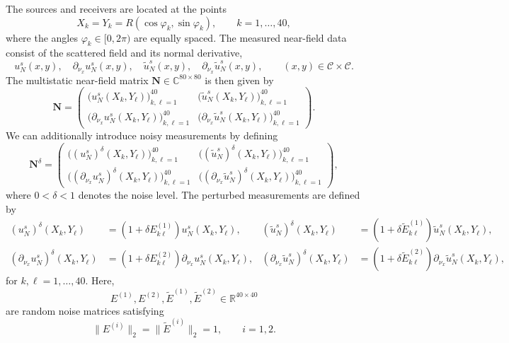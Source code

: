 \documentclass{article}
\begin{document}
The sources and receivers are located at the points 
\[
X_k=Y_k=R(\cos{\varphi_k},\sin{\varphi_k}),
\qquad k=1,\dots,40,
\]
where the angles $\varphi_k\in[0,2\pi)$ are equally spaced. The measured near-field data consist of the scattered field and its normal derivative,
\[
u_N^s(x,y),\quad \partial_{\nu_x}u_N^s(x,y),\quad
\widetilde{u}_N^s(x,y),\quad
\partial_{\nu_x}\widetilde{u}_N^s(x,y),
\qquad (x,y)\in\mathcal{C}\times\mathcal{C}.
\]
The multistatic near-field matrix $\mathbf{N}\in\mathbb{C}^{80\times80}$ is then given by
\begin{equation}\label{NFmatrix}
\mathbf{N}
=
\begin{pmatrix}
\big(u_N^s(X_k,Y_\ell)\big)_{k,\ell=1}^{40}
&
\big(\widetilde{u}_N^s(X_k,Y_\ell)\big)_{k,\ell=1}^{40}
\\[2mm]
\big(\partial_{\nu_x}u_N^s(X_k,Y_\ell)\big)_{k,\ell=1}^{40}
&
\big(\partial_{\nu_x}\widetilde{u}_N^s(X_k,Y_\ell)\big)_{k,\ell=1}^{40}
\end{pmatrix}.
\end{equation}
We can additionally introduce noisy measurements by defining
\begin{equation}
\mathbf{N}^{\delta}
=
\begin{pmatrix}\label{noisy_NFmatrix}
\big((u_N^s)^\delta(X_k,Y_\ell)\big)_{k,\ell=1}^{40}
&
\big((\widetilde{u}_N^s)^\delta(X_k,Y_\ell)\big)_{k,\ell=1}^{40}
\\[2mm]
\big((\partial_{\nu_x}u_N^s)^\delta(X_k,Y_\ell)\big)_{k,\ell=1}^{40}
&
\big((\partial_{\nu_x}\widetilde{u}_N^s)^\delta(X_k,Y_\ell)\big)_{k,\ell=1}^{40}
\end{pmatrix},
\end{equation}
where $0<\delta<1$ denotes the noise level. The perturbed measurements are defined by
\begin{align}
(u_N^s)^\delta(X_k,Y_\ell)
&=(1+\delta E^{(1)}_{k\ell})u_N^s(X_k,Y_\ell),
&
(\widetilde{u}_N^s)^\delta(X_k,Y_\ell)
&=(1+\delta \widetilde E^{(1)}_{k\ell})
\widetilde{u}_N^s(X_k,Y_\ell),
\nonumber\\
(\partial_{\nu_x}u_N^s)^\delta(X_k,Y_\ell)
&=(1+\delta E^{(2)}_{k\ell})
\partial_{\nu_x}u_N^s(X_k,Y_\ell),
&
(\partial_{\nu_x}\widetilde{u}_N^s)^\delta(X_k,Y_\ell)
&=(1+\delta \widetilde E^{(2)}_{k\ell})
\partial_{\nu_x}\widetilde{u}_N^s(X_k,Y_\ell),
\label{noise_data}
\end{align}
for $k,\ell=1,\dots,40$. Here,
\[
E^{(1)},E^{(2)},\widetilde E^{(1)},\widetilde E^{(2)}
\in\mathbb R^{40\times40}
\]
are random noise matrices satisfying
\[
\|E^{(i)}\|_2=\|\widetilde E^{(i)}\|_2=1,
\qquad i=1,2.
\]
\end{document}
